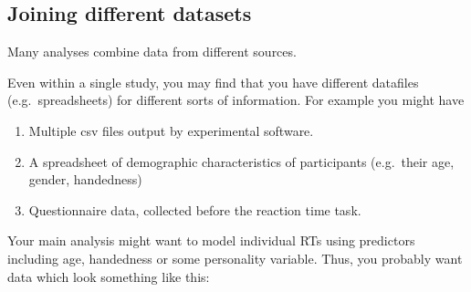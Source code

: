 \documentclass[]{article}
\newenvironment{Shaded}{\begin{snugshade}}{\end{snugshade}}
\newcommand{\KeywordTok}[1]{\textcolor[rgb]{0.13,0.29,0.53}{\textbf{#1}}}
\newcommand{\StringTok}[1]{\textcolor[rgb]{0.31,0.60,0.02}{#1}}
\newcommand{\OperatorTok}[1]{\textcolor[rgb]{0.81,0.36,0.00}{\textbf{#1}}}
\newcommand{\NormalTok}[1]{#1}
\theoremstyle{definition}
\theoremstyle{definition}
\theoremstyle{definition}
\theoremstyle{remark}
\begin{document}
\subsection{Joining different
datasets}\label{joining-different-datasets}

Many analyses combine data from different sources.

Even within a single study, you may find that you have different
datafiles (e.g.~spreadsheets) for different sorts of information. For
example you might have

\begin{enumerate}
\def\labelenumi{\arabic{enumi}.}
\item
  Multiple csv files output by experimental software.
\item
  A spreadsheet of demographic characteristics of participants
  (e.g.~their age, gender, handedness)
\item
  Questionnaire data, collected before the reaction time task.
\end{enumerate}

Your main analysis might want to model individual RTs using predictors
including age, handedness or some personality variable. Thus, you
probably want data which look something like this:

\begin{Shaded}
\end{Shaded}
\end{document}
